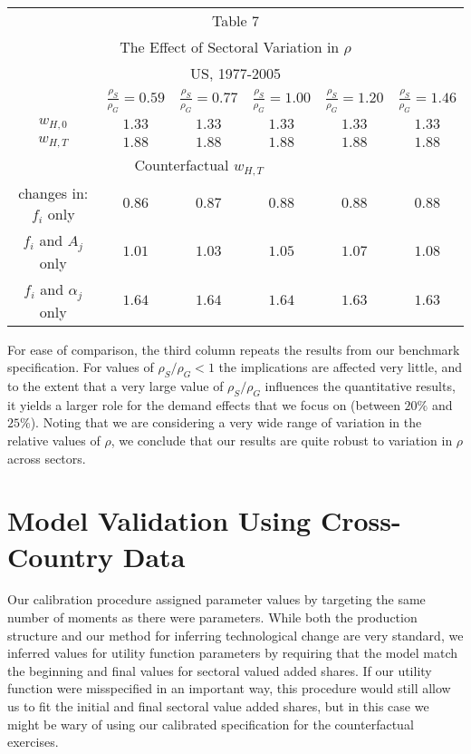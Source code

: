 \documentclass[10pt]{article}
\begin{document}
\begin{center}
{\small 
\begin{tabular}{cccccc}
\multicolumn{6}{c}{Table 7} \\ 
\multicolumn{6}{c}{The Effect of Sectoral Variation in $\rho $} \\ 
\multicolumn{6}{c}{US, 1977-2005} \\ \hline\hline
& $\frac{\rho_{S}}{\rho_{G}}=0.59$ & $\frac{\rho_{S}}{\rho_{G}}=0.77$ & $%
\frac{\rho_{S}}{\rho_{G}}=1.00$ & $\frac{\rho_{S}}{\rho_{G}}=1.20$ & $%
\frac{\rho_{S}}{\rho_{G}}=1.46$ \\ \hline
$w_{H,0}$ & $1.33$ & $1.33$ & $1.33$ & $1.33$ & $1.33$ \\ 
$w_{H,T}$ & $1.88$ & $1.88$ & $1.88$ & $1.88$ & $1.88$ \\ 
\multicolumn{5}{c}{Counterfactual $w_{H,T}$} &  \\ 
changes in: $f_{i}$ only & $0.86$ & $0.87$ & $0.88$ & $0.88$ & $0.88$ \\ 
\quad \quad $f_{i}$ and $A_{j}$ only & $1.01$ & $1.03$ & $1.05$ & $1.07$ & $%
1.08$ \\ 
\quad \quad $f_{i}$ and $\alpha _{j}$ only & $1.64$ & $1.64$ & $1.64$ & $%
1.63 $ & $1.63$ \\ \hline\hline
\end{tabular}
}
\end{center}

For ease of comparison, the third column repeats the results from our
benchmark specification. For values of $\rho_{S}/\rho_{G}<1$ the
implications are affected very little, and to the extent that a very large
value of $\rho_{S}/\rho_{G}$ influences the quantitative results, it
yields a larger role for the demand effects that we focus on (between $20\%$
and $25\%$). Noting that we are considering a very wide range of variation
in the relative values of $\rho $, we conclude that our results are quite
robust to variation in $\rho $ across sectors.

\section{Model Validation Using Cross-Country Data}

Our calibration procedure assigned parameter values by targeting the same
number of moments as there were parameters. While both the production
structure and our method for inferring technological change are very
standard, we inferred values for utility function parameters by requiring
that the model match the beginning and final values for sectoral valued
added shares. If our utility function were misspecified in an important way,
this procedure would still allow us to fit the initial and final sectoral
value added shares, but in this case we might be wary of using our
calibrated specification for the counterfactual exercises.
\end{document}
